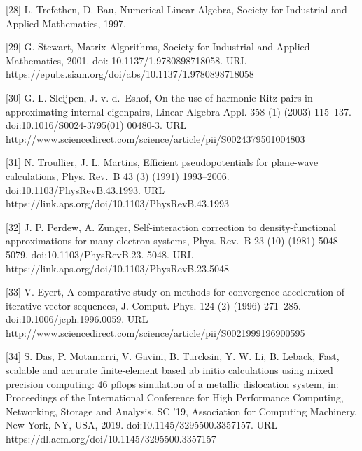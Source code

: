 \documentclass[
  10
]{article}
\begin{document}
{[}28{]} L. Trefethen, D. Bau, Numerical Linear Algebra, Society for
Industrial and Applied Mathematics, 1997.

{[}29{]} G. Stewart, Matrix Algorithms, Society for Industrial and
Applied Mathematics, 2001. doi: 10.1137/1.9780898718058. URL
https://epubs.siam.org/doi/abs/10.1137/1.9780898718058

{[}30{]} G. L. Sleijpen, J. v. d.~Eshof, On the use of harmonic Ritz
pairs in approximating internal eigenpairs, Linear Algebra Appl. 358 (1)
(2003) 115--137. doi:10.1016/S0024-3795(01) 00480-3. URL
http://www.sciencedirect.com/science/article/pii/S0024379501004803

{[}31{]} N. Troullier, J. L. Martins, Efficient pseudopotentials for
plane-wave calculations, Phys. Rev.~B 43 (3) (1991) 1993--2006.
doi:10.1103/PhysRevB.43.1993. URL
https://link.aps.org/doi/10.1103/PhysRevB.43.1993

{[}32{]} J. P. Perdew, A. Zunger, Self-interaction correction to
density-functional approximations for many-electron systems, Phys.
Rev.~B 23 (10) (1981) 5048--5079. doi:10.1103/PhysRevB.23. 5048. URL
https://link.aps.org/doi/10.1103/PhysRevB.23.5048

{[}33{]} V. Eyert, A comparative study on methods for convergence
acceleration of iterative vector sequences, J. Comput. Phys. 124 (2)
(1996) 271--285. doi:10.1006/jcph.1996.0059. URL
http://www.sciencedirect.com/science/article/pii/S0021999196900595

{[}34{]} S. Das, P. Motamarri, V. Gavini, B. Turcksin, Y. W. Li, B.
Leback, Fast, scalable and accurate finite-element based ab initio
calculations using mixed precision computing: 46 pflops simulation of a
metallic dislocation system, in: Proceedings of the International
Conference for High Performance Computing, Networking, Storage and
Analysis, SC '19, Association for Computing Machinery, New York, NY,
USA, 2019. doi:10.1145/3295500.3357157. URL
https://dl.acm.org/doi/10.1145/3295500.3357157
\end{document}
